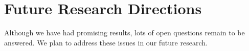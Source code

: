 \documentclass[letterpaper,12pt,titlepage,oneside,final]{book}
\begin{document}

\section{Future Research Directions}

Although we have had  promising results, lots of open questions remain to be answered. We plan to address these issues in our future research.
\end{document}
